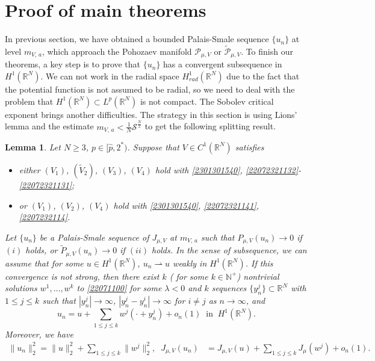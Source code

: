 \documentclass[10pt]{article}
\numberwithin{equation}{section}
\newtheorem{lemma}[theorem]{Lemma}
\numberwithin{equation}{section}
\begin{document}
\section{Proof of main theorems}\label{2306251340}
In previous section, we have obtained a bounded Palais-Smale sequence $\{u_n\}$ at level $m_{V,\, a}$, which approach the Pohozaev manifold $\mathcal{P}_{\mu, V}$ or $\widetilde{\mathcal{P}}_{\mu, V}$. To finish our theorems, a key step is to prove that $\{u_n\}$ has a convergent subsequence in $H^1(\mathbb{R}^N)$. We can not work in the radial space $H_{rad}^1(\mathbb{R}^N)$ due to the fact that the potential function is not assumed to be radial, so we need to deal with the problem that $H^1(\mathbb{R}^N)\subset L^p(\mathbb{R}^N)$ is not compact. The Sobolev critical exponent brings another difficulties. The strategy in this section is using Lions' lemma and the estimate $m_{V,\, a}<\frac{1}{N}\mathcal{S}^{\frac{N}{2}}$ to get the following splitting result.
\begin{lemma}\label{2207110022}
Let $N\ge 3$, $p\in [\hat{p}, 2^*)$. Suppose that $V\in C^1(\mathbb{R}^N)$ satisfies
\begin{itemize}
\item[$(i)$] either $(V_1)$, $(\widetilde{V}_2)$, $(V_3)$, $(V_4)$ hold with \eqref{2301301540}, \eqref{22072321132}-\eqref{22072321131};
\item[$(ii)$] or $(V_1)$, $(V_2)$, $(V_4)$ hold with \eqref{2301301540}, \eqref{22072321141}, \eqref{2207232114}.
\end{itemize}
Let $\{u_n\}$ be a Palais-Smale sequence of $J_{\mu, V}$ at ${m}_{V,\, a}$ such that $P_{\mu, V}(u_n)\to 0$ if $(i)$ holds, or $\widetilde{P}_{\mu, V}(u_n)\to 0$ if $(ii)$ holds. In the sense of subsequence, we can assume that for some $u\in H^1(\mathbb{R}^N)$, $u_n \rightharpoonup u$ weakly in $H^1(\mathbb{R}^N)$. If this convergence is not strong, then there exist $k$ ( for some $k\in \mathbb{N}^+$) nontrivial solutions $w^1,\dots, w^k$ to \eqref{22071100} for some $\lambda<0$ and $k$ sequences $\{y_n^j\}\subset\mathbb{R}^N$ with $1\le j \le k$ such that $|y_n^j|\rightarrow \infty$, $|y_n^j-y_n^i|\to \infty$ for $i\neq j$ as $n\to \infty$, and
\begin{equation}\label{2207110010}
  u_n=u+\sum_{1\le j\le k} w^j(\cdot + y_n^j)+o_n(1) \;\; \text{in} \;\; H^1(\mathbb{R}^N).
\end{equation}
Moreover, we have
\begin{equation}\label{2207110009}
    \begin{aligned}
        \|u_n\|_2^2=\|u\|_2^2+\sum_{1\leq j\leq k} \|w^j\|_2^2,\;\;J_{\mu, V}(u_n)&=J_{\mu, V}(u)+\sum_{1\le j\le k} J_{\mu}(w^j)+o_n(1).
    \end{aligned}
\end{equation}
\end{lemma}
\end{document}
